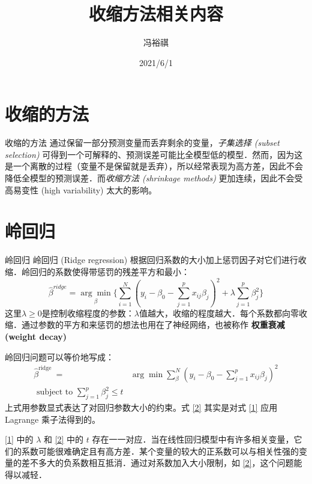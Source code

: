 \documentclass[
  15pt,
  ignorenonframetext,
]{beamer}
\title{收缩方法相关内容}
\author{冯裕祺}
\date{2021/6/1}
\begin{document}
\frame{\titlepage}

\begin{frame}[allowframebreaks]
  \tableofcontents[hideallsubsections]
\end{frame}
\hypertarget{ux6536ux7f29ux7684ux65b9ux6cd5}{%
\section{收缩的方法}\label{ux6536ux7f29ux7684ux65b9ux6cd5}}

\begin{frame}{收缩的方法}
通过保留一部分预测变量而丢弃剩余的变量，\emph{子集选择 (subset
selection)}
可得到一个可解释的、预测误差可能比全模型低的模型．然而，因为这是一个离散的过程（变量不是保留就是丢弃），所以经常表现为高方差，因此不会降低全模型的预测误差．而\emph{收缩方法
(shrinkage methods)} 更加连续，因此不会受高易变性 (high variability)
太大的影响。
\end{frame}

\hypertarget{ux5cadux56deux5f52}{%
\section{岭回归}\label{ux5cadux56deux5f52}}

\begin{frame}{岭回归}
岭回归 (Ridge regression)
根据回归系数的大小加上惩罚因子对它们进行收缩．岭回归的系数使得带惩罚的残差平方和最小：
\[
\hat{\beta}^{ridge}=\underset{\beta}{\arg\min}\Big\{\sum\limits_{i=1}^N(y_i-\beta_0-\sum\limits_{j=1}^px_{ij}\beta_j)^2+\lambda\sum\limits_{j=1}^p\beta_j^2\Big\}
\tag{1}
\label{1}
\]
这里\(\lambda\ge0\)是控制收缩程度的参数：\(\lambda\)值越大，收缩的程度越大．每个系数都向零收缩．通过参数的平方和来惩罚的想法也用在了神经网络，也被称作
\textbf{权重衰减 (weight decay)}
\end{frame}

\begin{frame}
岭回归问题可以等价地写成： \[
\begin{aligned}
\hat{\beta}^{\text {ridge }}=& \arg \min \sum_{\beta}^{N}\left(y_{i}-\beta_{0}-\sum_{j=1}^{p} x_{i j} \beta_{j}\right)^{2} \\
\text { subject to } \sum_{j=1}^{p} \beta_{j}^{2} \leq t
\end{aligned}
\tag{2}
\label{2}
\] 上式用参数显式表达了对回归参数大小的约束。式 \eqref{2} 其实是对式
\eqref{1} 应用 Lagrange 乘子法得到的。
\end{frame}

\begin{frame}
\eqref{1} 中的 \(\lambda\) 和 \eqref{2} 中的 \(t\)
存在一一对应．当在线性回归模型中有许多相关变量，它们的系数可能很难确定且有高方差．某个变量的较大的正系数可以与相关性强的变量的差不多大的负系数相互抵消．通过对系数加入大小限制，如
\eqref{2}，这个问题能得以减轻．
\end{frame}
\end{document}
